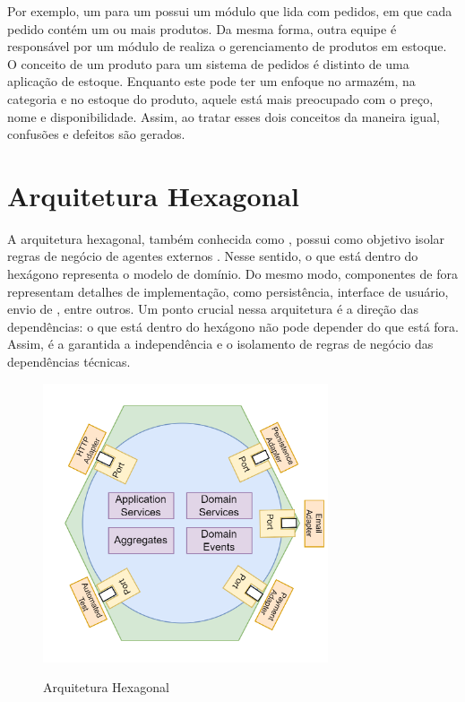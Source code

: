Por exemplo, um  para um  possui um módulo que lida com pedidos, em que cada pedido contém um ou mais produtos. Da mesma forma, outra equipe é responsável por um módulo de realiza o gerenciamento de produtos em estoque. O conceito de um produto para um sistema de pedidos é distinto de uma aplicação de estoque. Enquanto este pode ter um enfoque no armazém, na categoria e no estoque do produto, aquele está mais preocupado com o preço, nome e disponibilidade. Assim, ao tratar esses dois conceitos da maneira igual, confusões e defeitos são gerados.

\section{Arquitetura Hexagonal} 
\label{section:hexagonal}
A arquitetura hexagonal, também conhecida como , possui como objetivo isolar regras de negócio de agentes externos \cite{cockburn2005}. Nesse sentido, o que está dentro do hexágono representa o modelo de domínio. Do mesmo modo, componentes de fora representam detalhes de implementação, como persistência, interface de usuário, envio de , entre outros. Um ponto crucial nessa arquitetura é a direção das dependências: o que está dentro do hexágono não pode depender do que está fora. Assim, é a garantida a independência e o isolamento de regras de negócio das dependências técnicas.

\begin{figure}[!ht]
    \centering
    \caption{Arquitetura Hexagonal}
    \includegraphics[width=0.75\textwidth]{media/hexagonal_architecture.png}
    \label{fig:arquitetura_hexagonal}
\end{figure}

